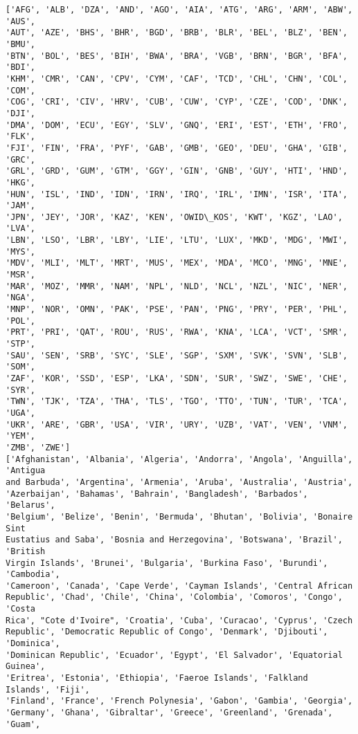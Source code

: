 \documentclass[11pt]{article}
\begin{document}
    \begin{Verbatim}[commandchars=\\\{\}]
['AFG', 'ALB', 'DZA', 'AND', 'AGO', 'AIA', 'ATG', 'ARG', 'ARM', 'ABW', 'AUS',
'AUT', 'AZE', 'BHS', 'BHR', 'BGD', 'BRB', 'BLR', 'BEL', 'BLZ', 'BEN', 'BMU',
'BTN', 'BOL', 'BES', 'BIH', 'BWA', 'BRA', 'VGB', 'BRN', 'BGR', 'BFA', 'BDI',
'KHM', 'CMR', 'CAN', 'CPV', 'CYM', 'CAF', 'TCD', 'CHL', 'CHN', 'COL', 'COM',
'COG', 'CRI', 'CIV', 'HRV', 'CUB', 'CUW', 'CYP', 'CZE', 'COD', 'DNK', 'DJI',
'DMA', 'DOM', 'ECU', 'EGY', 'SLV', 'GNQ', 'ERI', 'EST', 'ETH', 'FRO', 'FLK',
'FJI', 'FIN', 'FRA', 'PYF', 'GAB', 'GMB', 'GEO', 'DEU', 'GHA', 'GIB', 'GRC',
'GRL', 'GRD', 'GUM', 'GTM', 'GGY', 'GIN', 'GNB', 'GUY', 'HTI', 'HND', 'HKG',
'HUN', 'ISL', 'IND', 'IDN', 'IRN', 'IRQ', 'IRL', 'IMN', 'ISR', 'ITA', 'JAM',
'JPN', 'JEY', 'JOR', 'KAZ', 'KEN', 'OWID\_KOS', 'KWT', 'KGZ', 'LAO', 'LVA',
'LBN', 'LSO', 'LBR', 'LBY', 'LIE', 'LTU', 'LUX', 'MKD', 'MDG', 'MWI', 'MYS',
'MDV', 'MLI', 'MLT', 'MRT', 'MUS', 'MEX', 'MDA', 'MCO', 'MNG', 'MNE', 'MSR',
'MAR', 'MOZ', 'MMR', 'NAM', 'NPL', 'NLD', 'NCL', 'NZL', 'NIC', 'NER', 'NGA',
'MNP', 'NOR', 'OMN', 'PAK', 'PSE', 'PAN', 'PNG', 'PRY', 'PER', 'PHL', 'POL',
'PRT', 'PRI', 'QAT', 'ROU', 'RUS', 'RWA', 'KNA', 'LCA', 'VCT', 'SMR', 'STP',
'SAU', 'SEN', 'SRB', 'SYC', 'SLE', 'SGP', 'SXM', 'SVK', 'SVN', 'SLB', 'SOM',
'ZAF', 'KOR', 'SSD', 'ESP', 'LKA', 'SDN', 'SUR', 'SWZ', 'SWE', 'CHE', 'SYR',
'TWN', 'TJK', 'TZA', 'THA', 'TLS', 'TGO', 'TTO', 'TUN', 'TUR', 'TCA', 'UGA',
'UKR', 'ARE', 'GBR', 'USA', 'VIR', 'URY', 'UZB', 'VAT', 'VEN', 'VNM', 'YEM',
'ZMB', 'ZWE']
['Afghanistan', 'Albania', 'Algeria', 'Andorra', 'Angola', 'Anguilla', 'Antigua
and Barbuda', 'Argentina', 'Armenia', 'Aruba', 'Australia', 'Austria',
'Azerbaijan', 'Bahamas', 'Bahrain', 'Bangladesh', 'Barbados', 'Belarus',
'Belgium', 'Belize', 'Benin', 'Bermuda', 'Bhutan', 'Bolivia', 'Bonaire Sint
Eustatius and Saba', 'Bosnia and Herzegovina', 'Botswana', 'Brazil', 'British
Virgin Islands', 'Brunei', 'Bulgaria', 'Burkina Faso', 'Burundi', 'Cambodia',
'Cameroon', 'Canada', 'Cape Verde', 'Cayman Islands', 'Central African
Republic', 'Chad', 'Chile', 'China', 'Colombia', 'Comoros', 'Congo', 'Costa
Rica', "Cote d'Ivoire", 'Croatia', 'Cuba', 'Curacao', 'Cyprus', 'Czech
Republic', 'Democratic Republic of Congo', 'Denmark', 'Djibouti', 'Dominica',
'Dominican Republic', 'Ecuador', 'Egypt', 'El Salvador', 'Equatorial Guinea',
'Eritrea', 'Estonia', 'Ethiopia', 'Faeroe Islands', 'Falkland Islands', 'Fiji',
'Finland', 'France', 'French Polynesia', 'Gabon', 'Gambia', 'Georgia',
'Germany', 'Ghana', 'Gibraltar', 'Greece', 'Greenland', 'Grenada', 'Guam',

\end{Verbatim}
\end{document}
